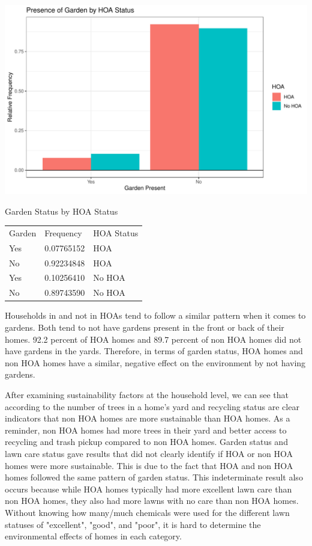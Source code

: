 \documentclass{article}
\begin{document}
\newpage
\includegraphics{exam1-011}

\begin{center} Garden Status by HOA Status \end{center}
\begin{table}[h]
\begin{tabular}{lll}
Garden & Frequency  & HOA Status \\
Yes     & 0.07765152 & HOA        \\
No    & 0.92234848 & HOA        \\
Yes     & 0.10256410 & No HOA     \\
No    & 0.89743590 & No HOA    
\end{tabular}
\end{table}


Households in and not in HOAs tend to follow a similar pattern when it comes to gardens. Both tend to not have gardens present in the front or back of their homes. 92.2 percent of HOA homes and 89.7 percent of non HOA homes did not have gardens in the yards. Therefore, in terms of garden status, HOA homes and non HOA homes have a similar, negative effect on the environment by not having gardens.
\newline

After examining sustainability factors at the household level, we can see that according to the number of trees in a home's yard and recycling status are clear indicators that non HOA homes are more sustainable than HOA homes. As a reminder, non HOA homes had more trees in their yard and better access to recycling and trash pickup compared to non HOA homes. Garden status and lawn care status gave results that did not clearly identify if HOA or non HOA homes were more sustainable. This is due to the fact that HOA and non HOA homes followed the same pattern of garden status. This indeterminate result also occurs because while HOA homes typically had more excellent lawn care than non HOA homes, they also had more lawns with no care than non HOA homes. Without knowing how many/much chemicals were used for the different lawn statuses of "excellent", "good", and "poor", it is hard to determine the environmental effects of homes in each category.
\newline
\end{document}
